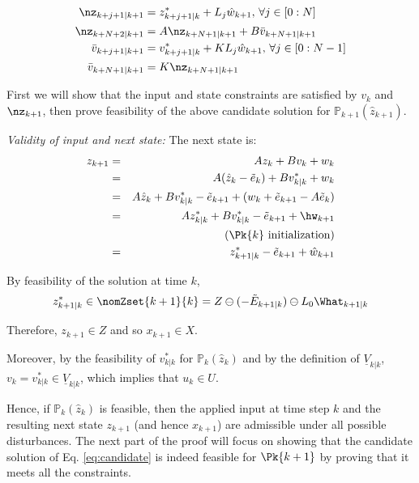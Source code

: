 \begin{subequations}
\begin{align}
\label{eq:candidate}
\nz_{k+j+1|k+1} &= z^{*}_{k+j+1|k} + L_j\hat{w}_{k+1}, \, \forall j \in [0:N]\\
\nz_{k+N+2|k+1}&= A\nz_{k+N+1|k+1} + B\bar{v}_{k+N+1|k+1} \\
\bar{v}_{k+j+1|k+1}&=v^{*}_{k+j+1|k} + KL_j\hat{w}_{k+1}, \, \forall j \in [0:N-1]\\
\bar{v}_{k+N+1|k+1}&=K\nz_{k+N+1|k+1} 
\end{align}
\end{subequations}

First we will show that the input and state constraints are satisfied by $v_k$ and $\nz_{k+1}$, then prove feasibility of the above candidate solution for $\mathbb{P}_{k+1}(\hat{z}_{k+1})$.

\textit{Validity of input and next state:}
The next state is:
\begin{eqnarray}
\label{eq:z_next}
z_{k+1} &= &Az_k + Bv_k + w_k \nonumber
\\
&=& A(\hat{z}_k-\tilde{e}_k)+Bv^{*}_{k|k}+w_k \nonumber \\
 &=& A\hat{z}_k+Bv^{*}_{k|k}-\tilde{e}_{k+1}+(w_k+\tilde{e}_{k+1}-A\tilde{e}_k) \nonumber \\
  &=& Az^{*}_{k|k} +Bv^{*}_{k|k}-\tilde{e}_{k+1}+  \hw_{k+1} \nonumber\\
  & \;& \quad (\Pk{k} \text{ initialization}) \nonumber \\
&= &z^{*}_{k+1|k} - \tilde{e}_{k+1} + \hat{w}_{k+1} 
\end{eqnarray}

By feasibility of the solution at time $k$,
\begin{equation*}
z^{*}_{k+1|k} \in\nomZset{k+1}{k} = Z \ominus (-\tilde{E}_{k+1|k}) \ominus L_0\What_{k+1|k}
\end{equation*}

Therefore, $z_{k+1} \in Z$ and so $x_{k+1} \in X$.

Moreover, by the feasibility of $v^{*}_{k|k}$ for $\mathbb{P}_{k}(\hat{z}_k)$ and by the definition of $\underline{V}_{k|k}$,
$v_k = v^{*}_{k|k} \in \underline{V}_{k|k}$, which implies that $u_k \in U$.

Hence, if $\mathbb{P}_{k}(\hat{z}_k)$ is feasible, then the applied input at time step $k$ and the resulting next state $z_{k+1}$ (and hence $x_{k+1}$) are admissible under all possible disturbances. 
The next part of the proof will focus on showing that the candidate solution of Eq. \eqref{eq:candidate} is indeed feasible for $\Pk{k+1}$ by proving that it meets all the constraints.

